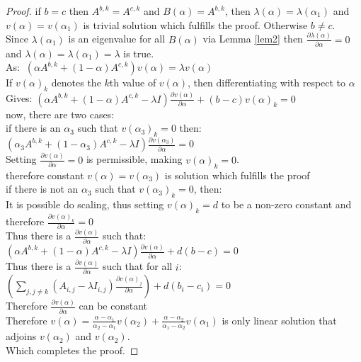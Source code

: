 \begin{proof}
if $b=c$ then $A^{b,k}=A^{c,k}$ and $B(\alpha) = A^{b,k}$, then $\lambda(\alpha)=\lambda(\alpha_1)$ and $v(\alpha)=v(\alpha_1)$ is trivial solution which fulfills the proof. Otherwise $b\ne c$.\\
Since $\lambda(\alpha_1)$ is an eigenvalue for all $B(\alpha)$ via Lemma \ref{lem2} then $\frac{\partial \lambda(\alpha)}{\partial \alpha}=0$ and $\lambda(\alpha)=\lambda(\alpha_1)=\lambda$ is true.\\
As: $~\left(\alpha A^{b,k} + (1-\alpha)A^{c,k}\right)v(\alpha)=\lambda v(\alpha)$\\
If $v(\alpha)_k$ denotes the $k$th value of $v(\alpha)$, then differentiating with respect to $\alpha$ \\
Gives: $\left(\alpha A^{b,k} + (1-\alpha)A^{c,k} - \lambda I\right)\frac{\partial v(\alpha)}{\partial\alpha}+(b-c)v(\alpha)_k=0$\\
now, there are two cases:\\
if there is an $\alpha_3$ such that $v(\alpha_3)_k=0$ then:\\
\-\hspace{8mm}$\left(\alpha_3 A^{b,k} + (1-\alpha_3)A^{c,k} - \lambda I\right)\frac{\partial v(\alpha_3)}{\partial\alpha}=0$\\
\-\hspace{8mm}Setting $\frac{\partial v(\alpha)}{\partial\alpha}=0$ is permissible, making $v(\alpha)_k=0$.\\
\-\hspace{8mm}therefore constant $v(\alpha)=v(\alpha_3)$ is solution which fulfills the proof\\
if there is not an $\alpha_3$ such that $v(\alpha_3)_k=0$, then:\\
\-\hspace{8mm}It is possible do scaling, thus setting $v(\alpha)_k=d$ to be a non-zero constant and therefore $\frac{\partial v(\alpha)_k}{\partial \alpha}=0$\\
\-\hspace{8mm}Thus there is a $\frac{\partial v(\alpha)}{\partial\alpha}$ such that: $\left(\alpha A^{b,k} + (1-\alpha)A^{c,k} - \lambda I\right)\frac{\partial v(\alpha)}{\partial\alpha}+d(b-c)=0$\\
\-\hspace{8mm}Thus there is a $\frac{\partial v(\alpha)}{\partial\alpha}$ such that for all $i$: $\left(\sum_{j,j\ne k}\left(A_{i,j}-\lambda I_{i,j}\right)\frac{\partial v(\alpha)_j}{\partial\alpha}\right) +d(b_i-c_i)=0 $\\
\-\hspace{8mm}Therefore $\frac{\partial v(\alpha)}{\partial\alpha}$ can be constant\\
\-\hspace{8mm}Therefore $v(\alpha)=\frac{\alpha-\alpha_1}{\alpha_2-\alpha_1}v(\alpha_2)+\frac{\alpha-\alpha_2}{\alpha_1-\alpha_2}v(\alpha_1)$ is only linear solution that adjoins $v(\alpha_2)$ and $v(\alpha_2)$.\\
Which completes the proof.
\end{proof}

